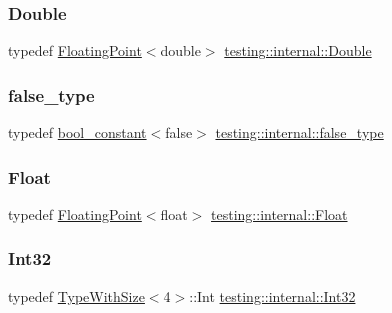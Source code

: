 \subsubsection{\texorpdfstring{Double}{Double}}
{\footnotesize\ttfamily typedef \mbox{\hyperlink{classtesting_1_1internal_1_1FloatingPoint}{Floating\+Point}}$<$double$>$ \mbox{\hyperlink{namespacetesting_1_1internal_a66a7579b1893b260c31dad577f7a5c48}{testing\+::internal\+::\+Double}}}

\mbox{\label{namespacetesting_1_1internal_abb1d0789f19bdde21affccbd1078b525}} 
\subsubsection{\texorpdfstring{false\_type}{false\_type}}
{\footnotesize\ttfamily typedef \mbox{\hyperlink{structtesting_1_1internal_1_1bool__constant}{bool\+\_\+constant}}$<$false$>$ \mbox{\hyperlink{namespacetesting_1_1internal_abb1d0789f19bdde21affccbd1078b525}{testing\+::internal\+::false\+\_\+type}}}

\mbox{\label{namespacetesting_1_1internal_a02e1981f5ff70609e6ac06e006ff519a}} 
\subsubsection{\texorpdfstring{Float}{Float}}
{\footnotesize\ttfamily typedef \mbox{\hyperlink{classtesting_1_1internal_1_1FloatingPoint}{Floating\+Point}}$<$float$>$ \mbox{\hyperlink{namespacetesting_1_1internal_a02e1981f5ff70609e6ac06e006ff519a}{testing\+::internal\+::\+Float}}}

\mbox{\label{namespacetesting_1_1internal_a8ee38faaf875f133358abaf9bc056cec}} 
\subsubsection{\texorpdfstring{Int32}{Int32}}
{\footnotesize\ttfamily typedef \mbox{\hyperlink{classtesting_1_1internal_1_1TypeWithSize}{Type\+With\+Size}}$<$4$>$\+::Int \mbox{\hyperlink{namespacetesting_1_1internal_a8ee38faaf875f133358abaf9bc056cec}{testing\+::internal\+::\+Int32}}}

